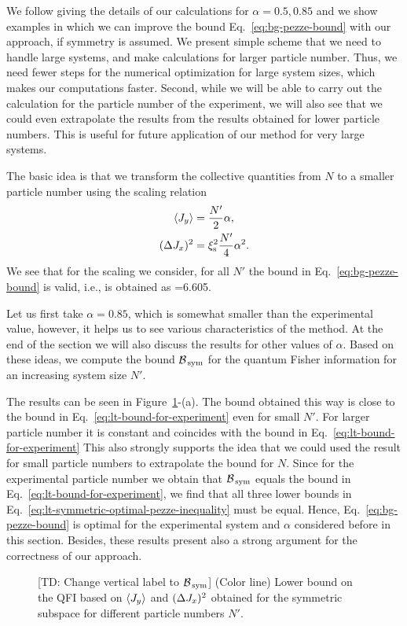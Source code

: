 We follow giving the details of our calculations for $\alpha=0.5,0.85$ and we show examples in which we can improve the bound Eq.~\eqref{eq:bg-pezze-bound} with our approach, if symmetry is assumed.
We present simple scheme that we need to handle large systems, and make calculations for larger particle number.
Thus, we need fewer steps for the numerical optimization for large system sizes, which makes our computations faster.
Second, while we will be able to carry out the calculation for the particle number of the experiment, we will also see that we could even extrapolate the results from the results obtained for lower particle numbers.
This is useful for future application of our method for very large systems.

The basic idea is that we transform the collective quantities from $N$ to a smaller particle number using the scaling relation
\begin{align}
  \langle{J_y}\rangle & = \frac{N'}{2}\alpha,\\
  (\Delta J_x )^2 & = \xi_{\textnormal{s}}^2 \frac{N'}{4}\alpha^2.
\end{align}
We see that for the scaling we consider, for all $N'$ the bound in Eq.~\eqref{eq:bg-pezze-bound} is valid, i.e., is obtained as
\be
  \geqslant {}=6.605.
\ee

Let us first take $\alpha=0.85$, which is somewhat smaller than the experimental value, however, it helps us to see various characteristics of the method.
At the end of the section we will also discuss the results for other values of $\alpha$.
Based on these ideas, we compute the bound $\mathcal{B}_{\, \textnormal{sym} }$ for the quantum Fisher information for an increasing system size $N'$.

The results can be seen in Figure~\ref{fig:lt-bounds-on-symmetric-spin-squeezing}-(a).
The bound obtained this way is close to the bound in Eq.~\eqref{eq:lt-bound-for-experiment} even for small $N'$.
For larger particle number it is constant and coincides with the bound in Eq.~\eqref{eq:lt-bound-for-experiment}
This also strongly supports the idea that we could used the result for small particle numbers to extrapolate the bound for $N$.
Since for the experimental particle number we obtain that $\mathcal{B}_{\, \text{sym} }$ equals the bound in Eq.~\eqref{eq:lt-bound-for-experiment}, we find that all three lower bounds in Eq.~\eqref{eq:lt-symmetric-optimal-pezze-inequality} must be equal.
Hence, Eq.~\eqref{eq:bg-pezze-bound} is optimal for the experimental system and $\alpha$ considered before in this section.
Besides, these results present also a strong argument for the correctness of our approach.
\begin{figure}[htp]
  \centering
  \caption[Asymptotic behavior of the bound for increasing particle number for spin-squeezing experimental data]{
  [TD: Change vertical label to $\mathcal{B}_{\, \textnormal{sym} }$] (Color line) Lower bound on the QFI based on $\langle{J_y}\rangle$ and $(\Delta J_x )^2$ obtained for the symmetric subspace for different particle numbers $N'$.}
  \label{fig:lt-bounds-on-symmetric-spin-squeezing}
\end{figure}

